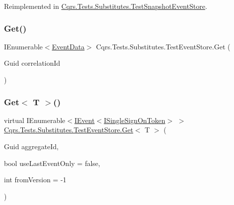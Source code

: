 Reimplemented in \hyperlink{classCqrs_1_1Tests_1_1Substitutes_1_1TestSnapshotEventStore_a7acb01defa795be81fc14a19ae703970_a7acb01defa795be81fc14a19ae703970}{Cqrs.\+Tests.\+Substitutes.\+Test\+Snapshot\+Event\+Store}.

\mbox{\label{classCqrs_1_1Tests_1_1Substitutes_1_1TestEventStore_afde308e712368690629564a1001928e6_afde308e712368690629564a1001928e6}} 
\subsubsection{\texorpdfstring{Get()}{Get()}\hspace{0.1cm}{\footnotesize\ttfamily [2/2]}}
{\footnotesize\ttfamily I\+Enumerable$<$\hyperlink{classCqrs_1_1Events_1_1EventData}{Event\+Data}$>$ Cqrs.\+Tests.\+Substitutes.\+Test\+Event\+Store.\+Get (\begin{DoxyParamCaption}\item[{Guid}]{correlation\+Id }\end{DoxyParamCaption})}

\mbox{\label{classCqrs_1_1Tests_1_1Substitutes_1_1TestEventStore_a3cbf3e72012e13320cf4d9bb47e9face_a3cbf3e72012e13320cf4d9bb47e9face}} 
\subsubsection{\texorpdfstring{Get$<$ T $>$()}{Get< T >()}}
{\footnotesize\ttfamily virtual I\+Enumerable$<$\hyperlink{interfaceCqrs_1_1Events_1_1IEvent}{I\+Event}$<$\hyperlink{interfaceCqrs_1_1Authentication_1_1ISingleSignOnToken}{I\+Single\+Sign\+On\+Token}$>$ $>$ \hyperlink{classCqrs_1_1Tests_1_1Substitutes_1_1TestEventStore_a58e89fab7fdfafff88c62317b6765e55_a58e89fab7fdfafff88c62317b6765e55}{Cqrs.\+Tests.\+Substitutes.\+Test\+Event\+Store.\+Get}$<$ T $>$ (\begin{DoxyParamCaption}\item[{Guid}]{aggregate\+Id,  }\item[{bool}]{use\+Last\+Event\+Only = {\ttfamily false},  }\item[{int}]{from\+Version = {\ttfamily -\/1} }\end{DoxyParamCaption})\hspace{0.3cm}{\ttfamily [virtual]}}

